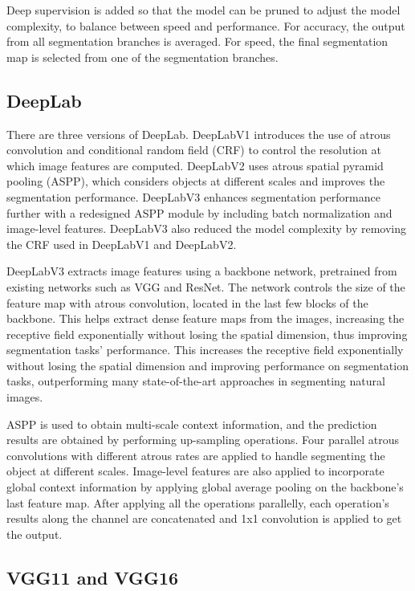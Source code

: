 \documentclass[conference]{IEEEtran}
\begin{document}
Deep supervision is added so that the model can be pruned to adjust the model complexity, to balance between speed and performance. For accuracy, the output from all segmentation branches is averaged. For speed, the final segmentation map is selected from one of the segmentation branches.

\subsection{DeepLab}

There are three versions of DeepLab. DeepLabV1 introduces the use of atrous convolution and conditional random field (CRF) to control the resolution at which image features are computed. DeepLabV2 uses atrous spatial pyramid pooling (ASPP), which considers objects at different scales and improves the segmentation performance. DeepLabV3 enhances segmentation performance further with a redesigned ASPP module by including batch normalization and image-level features. DeepLabV3 also reduced the model complexity by removing the CRF used in DeepLabV1 and DeepLabV2.

DeepLabV3 extracts image features using a backbone network, pretrained from existing networks such as VGG and ResNet. The network controls the size of the feature map with atrous convolution, located in the last few blocks of the backbone. This helps extract dense feature maps from the images, increasing the receptive field exponentially without losing the spatial dimension, thus improving segmentation tasks' performance. This increases the receptive field exponentially without losing the spatial dimension and improving performance on segmentation tasks, outperforming many state-of-the-art approaches in segmenting natural images.

ASPP is used to obtain multi-scale context information, and the prediction results are obtained by performing up-sampling operations. Four parallel atrous convolutions with different atrous rates are applied to handle segmenting the object at different scales. Image-level features are also applied to incorporate global context information by applying global average pooling on the backbone's last feature map. After applying all the operations parallelly, each operation's results along the channel are concatenated and 1x1 convolution is applied to get the output.

\subsection{VGG11 and VGG16}
\end{document}
